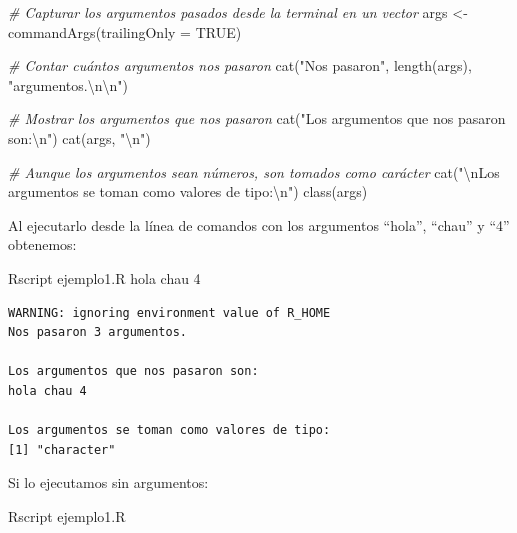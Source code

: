 \documentclass[
]{book}
\newenvironment{Shaded}{\begin{snugshade}}{\end{snugshade}}
\newcommand{\AttributeTok}[1]{\textcolor[rgb]{0.77,0.63,0.00}{#1}}
\newcommand{\CommentTok}[1]{\textcolor[rgb]{0.56,0.35,0.01}{\textit{#1}}}
\newcommand{\ConstantTok}[1]{\textcolor[rgb]{0.00,0.00,0.00}{#1}}
\newcommand{\ExtensionTok}[1]{#1}
\newcommand{\FunctionTok}[1]{\textcolor[rgb]{0.00,0.00,0.00}{#1}}
\newcommand{\NormalTok}[1]{#1}
\newcommand{\OtherTok}[1]{\textcolor[rgb]{0.56,0.35,0.01}{#1}}
\newcommand{\SpecialCharTok}[1]{\textcolor[rgb]{0.00,0.00,0.00}{#1}}
\newcommand{\StringTok}[1]{\textcolor[rgb]{0.31,0.60,0.02}{#1}}
\begin{document}
\begin{Shaded}
\begin{Highlighting}[]
\CommentTok{\# Capturar los argumentos pasados desde la terminal en un vector}
\NormalTok{args }\OtherTok{\textless{}{-}} \FunctionTok{commandArgs}\NormalTok{(}\AttributeTok{trailingOnly =} \ConstantTok{TRUE}\NormalTok{)}

\CommentTok{\# Contar cuántos argumentos nos pasaron}
\FunctionTok{cat}\NormalTok{(}\StringTok{"Nos pasaron"}\NormalTok{, }\FunctionTok{length}\NormalTok{(args), }\StringTok{"argumentos.}\SpecialCharTok{\textbackslash{}n\textbackslash{}n}\StringTok{"}\NormalTok{)}

\CommentTok{\# Mostrar los argumentos que nos pasaron}
\FunctionTok{cat}\NormalTok{(}\StringTok{"Los argumentos que nos pasaron son:}\SpecialCharTok{\textbackslash{}n}\StringTok{"}\NormalTok{)}
\FunctionTok{cat}\NormalTok{(args, }\StringTok{"}\SpecialCharTok{\textbackslash{}n}\StringTok{"}\NormalTok{)}

\CommentTok{\# Aunque los argumentos sean números, son tomados como carácter}
\FunctionTok{cat}\NormalTok{(}\StringTok{"}\SpecialCharTok{\textbackslash{}n}\StringTok{Los argumentos se toman como valores de tipo:}\SpecialCharTok{\textbackslash{}n}\StringTok{"}\NormalTok{)}
\FunctionTok{class}\NormalTok{(args)}
\end{Highlighting}
\end{Shaded}

Al ejecutarlo desde la línea de comandos con los argumentos ``hola'', ``chau'' y ``4'' obtenemos:

\begin{Shaded}
\begin{Highlighting}[]
\ExtensionTok{Rscript}\NormalTok{ ejemplo1.R hola chau 4}
\end{Highlighting}
\end{Shaded}

\begin{verbatim}
WARNING: ignoring environment value of R_HOME
Nos pasaron 3 argumentos.

Los argumentos que nos pasaron son:
hola chau 4 

Los argumentos se toman como valores de tipo:
[1] "character"
\end{verbatim}

Si lo ejecutamos sin argumentos:

\begin{Shaded}
\begin{Highlighting}[]
\ExtensionTok{Rscript}\NormalTok{ ejemplo1.R}
\end{Highlighting}
\end{Shaded}
\end{document}

